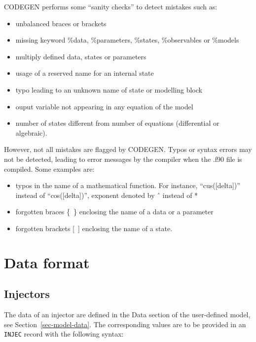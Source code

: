 CODEGEN performs some ``sanity checks'' to detect mistakes such as:
\begin{itemize}
\item unbalanced braces or brackets
\item missing keyword \%data, \%parameters, \%states, \%observables or \%models
\item multiply defined data, states or parameters
\item usage of a reserved name for an internal state
\item typo leading to an unknown name of state or modelling block
\item ouput variable not appearing in any equation of the model
\item number of states different from number of equations (differential or algebraic).
\end{itemize}

However, not all mistakes are flagged by CODEGEN. Typos or syntax errors may not be detected, leading to error messages by the compiler when the .f90 file is compiled. Some examples are:
\begin{itemize}
\item typos in the name of a mathematical function. For instance, ``cus([delta])'' instead of ``cos([delta])'', exponent denoted by {\large \^{~}} instead of {\large **}
\item forgotten braces \{~\} enclosing the name of a data or a parameter
\item forgotten brackets [~] enclosing the name of a state.
\end{itemize}

\section{Data format}

\subsection{Injectors}\label{format-inj}

The data of an injector are defined in the Data section of the user-defined model, see Section~\ref{sec-model-data}. The corresponding values are to be provided in an {\tt INJEC} record with the following syntax:

\hspace*{5ex}{\tt INJEC MODEL\_NAME INJ\_NAME BUS FP  FQ  P  Q  DATA1 DATA2 \ldots ;}

